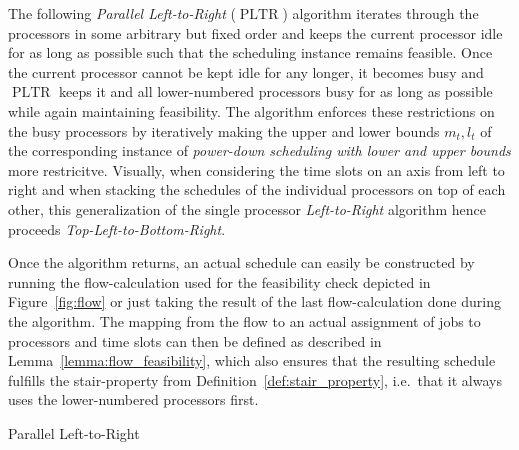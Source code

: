 \documentclass[a4paper]{article}
\DeclareMathOperator{\PLTR}{PLTR}
\DeclareMathOperator{\keepidle}{keepIdle}
\DeclareMathOperator{\keepbusy}{keepBusy}
\begin{document}
The following \emph{Parallel Left-to-Right} ($\PLTR$) algorithm iterates through the processors in some arbitrary but fixed order and keeps the current processor idle for as long as possible such that the scheduling instance remains feasible.
Once the current processor cannot be kept idle for any longer, it becomes busy and $\PLTR$ keeps it and all lower-numbered processors busy for as long as possible while again maintaining feasibility.
The algorithm enforces these restrictions on the busy processors by iteratively making the upper and lower bounds $m_t, l_t$ of the corresponding instance of \emph{power-down scheduling with lower and upper bounds} more restricitve.
Visually, when considering the time slots on an axis from left to right and when stacking the schedules of the individual processors on top of each other, this generalization of the single processor \emph{Left-to-Right} algorithm hence proceeds \emph{Top-Left-to-Bottom-Right}.

Once the algorithm returns, an actual schedule can easily be constructed by running the flow-calculation used for the feasibility check depicted in Figure~\ref{fig:flow} or just taking the result of the last flow-calculation done during the algorithm.
The mapping from the flow to an actual assignment of jobs to processors and time slots can then be defined as described in Lemma~\ref{lemma:flow_feasibility}, which also ensures that the resulting schedule fulfills the stair-property from Definition~\ref{def:stair_property}, i.e.\ that it always uses the lower-numbered processors first.

\begin{algorithm}[H]
\caption{Parallel Left-to-Right}\label{alg:pltr}
\begin{algorithmic}
      \State{$t \gets $\Call{$\keepidle$}{$k, t$}}
      \State{$t \gets $\Call{$\keepbusy$}{$k, t$}}
    \EndWhile{}
  \EndFor{}
\end{algorithmic}
\end{algorithm}
\end{document}
